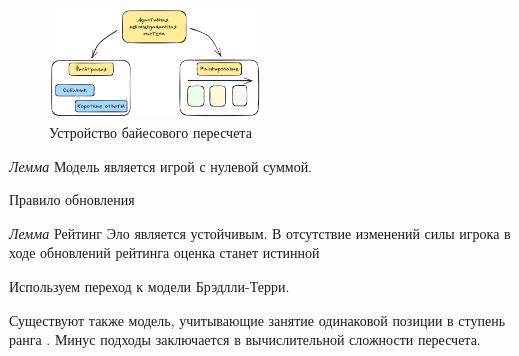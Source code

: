 \begin{figure}[h]
    \centering
    \includegraphics[width=0.5\textwidth]{assets/work/rating/bayes.excalidraw.png}
    \caption{Устройство байесового пересчета }
    \label{bayes}
\end{figure}

\textit{Лемма} Модель является игрой с нулевой суммой. 

 Правило обновления


\textit{Лемма} Рейтинг Эло является устойчивым. В отсутствие изменений силы игрока в ходе обновлений рейтинга оценка станет истинной

 Используем переход к модели Брэдлли-Терри.

Существуют также модель, учитывающие занятие одинаковой позиции в ступень ранга \cite{plackett1975analysis}\cite{luce2005individual}. 
Минус подходы заключается в вычислительной сложности пересчета.
